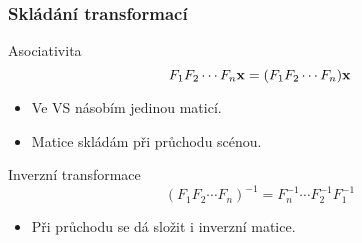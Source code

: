 \begin{frame}
    \frametitle{Skládání transformací}
    Asociativita
    \begin{equation*}
        F_1F_2\dotsb F_n\mathbf{x} = (F_1F_2\dotsb F_n)\mathbf{x}
    \end{equation*}
    \begin{itemize}
        \item Ve VS násobím jedinou maticí.
        \item Matice skládám při průchodu scénou.
    \end{itemize}
    \pause\vfill
    Inverzní transformace
    \begin{equation*}
        (F_1F_2\dotsb F_n)^{-1} = F_n^{-1}\dotsb F_2^{-1}F_1^{-1}
    \end{equation*}
    \begin{itemize}
        \item Při průchodu se dá složit i inverzní matice.
    \end{itemize}
\end{frame}

